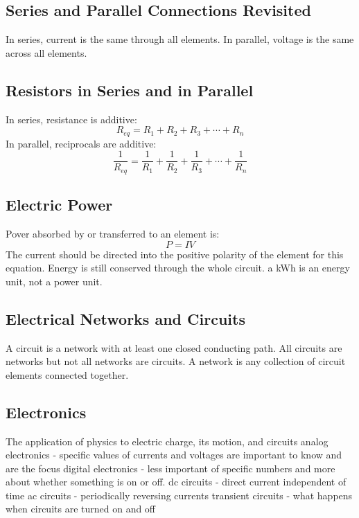 \documentclass[twocolumn]{article}
\begin{document}
\subsection{Series and Parallel Connections Revisited}
\begin{outline}
	\1 In series, current is the same through all elements.
	\1 In parallel, voltage is the same across all elements. 

\end{outline}
\subsection{Resistors in Series and in Parallel}
\begin{outline}
	\1 In series, resistance is additive: \[R_{eq}=R_1+R_2+R_3+\cdots+R_n\]
	\1 In parallel, reciprocals are additive: \[\dfrac{1}{R_{eq}}=\dfrac{1}{R_1}+\dfrac{1}{R_2}+\dfrac{1}{R_3}+\cdots+\dfrac{1}{R_n}\]

\end{outline}
\subsection{Electric Power}
\begin{outline}
	\1 Pover absorbed by or transferred to an element is: \[P=IV\] The current should be directed into the positive polarity of the element for this equation. 
	\1 Energy is still conserved through the whole circuit. 
	\1 a kWh is an energy unit, not a power unit. 
\end{outline}
\subsection{Electrical Networks and Circuits}
\begin{outline}
	\1 A circuit is a network with at least one closed conducting path. 
	\1 All circuits are networks but not all networks are circuits. 
	\1 A network is any collection of circuit elements connected together. 
\end{outline}
\subsection{Electronics}
\begin{outline}
	\1 The application of physics to electric charge, its motion, and circuits
	\1 analog electronics - specific values of currents and voltages are important to know and are the focus
	\1 digital electronics - less important of specific numbers and more about whether something is on or off. 
	\1 dc circuits - direct current independent of time
	\1 ac circuits - periodically reversing currents
	\1 transient circuits - what happens when circuits are turned on and off 
\end{outline}
\end{document}
